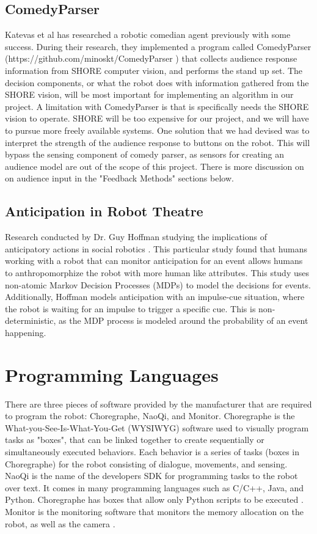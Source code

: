   \subsection{ComedyParser}
  Katevas et al \cite{KatevasRobot:2014} has researched a robotic comedian agent previously with some success. During their research, they implemented a program called ComedyParser (https://github.com/minoskt/ComedyParser ) that collects audience response information from SHORE computer vision, and performs the stand up set. The decision components, or what the robot does with information gathered from the SHORE vision, will be most important for implementing an algorithm in our project.
  A limitation with ComedyParser is that is specifically needs the SHORE vision to operate. SHORE will be too expensive for our project, and we will have to pursue more freely available systems. One solution that we had devised was to interpret the strength of the audience response to buttons on the robot. This will bypass the sensing component of comedy parser, as sensors for creating an audience model are out of the scope of this project. There is more discussion on on audience input in the "Feedback Methods" sections below.

  \subsection{Anticipation in Robot Theatre}
  Research conducted by Dr. Guy Hoffman studying the implications of anticipatory actions in social robotics \cite{hoffman2010anticipation}. This particular study found that humans working with a robot that can monitor anticipation for an event allows humans to anthropomorphize the robot with more human like attributes. This study uses non-atomic Markov Decision Processes (MDPs) to model the decisions for events. Additionally, Hoffman models anticipation with an impulse-cue situation, where the robot is waiting for an impulse to trigger a specific cue. This is non-deterministic, as the MDP process is modeled around the probability of an event happening.

\section{Programming Languages}

  There are three pieces of software provided by the manufacturer that are required to program the robot: Choregraphe, NaoQi, and Monitor. Choregraphe is the What-you-See-Is-What-You-Get (WYSIWYG) software used to visually program tasks as "boxes", that can be linked together to create sequentially or simultaneously executed behaviors. Each behavior is a series of tasks (boxes in Choregraphe) for the robot consisting of dialogue, movements, and sensing. NaoQi is the name of the developers SDK for programming tasks to the robot over text. It comes in many programming languages such as C/C++, Java, and Python. Choregraphe has boxes that allow only Python scripts to be executed \cite{programmingLanguages}. Monitor is the monitoring software that monitors the memory allocation on the robot, as well as the camera \cite{monitor}.

